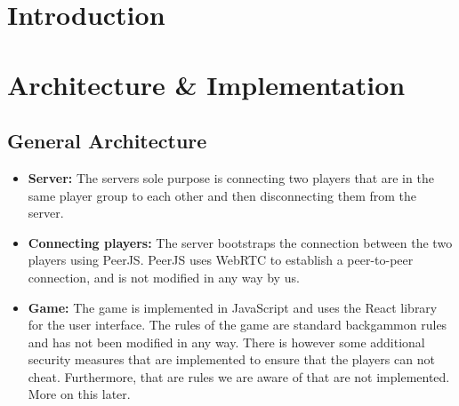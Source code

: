 \documentclass[ twoside,openright,titlepage,numbers=noenddot,headinclude,%
                footinclude=true,cleardoublepage=empty,abstractoff, %
                BCOR=5mm,paper=a4,fontsize=11pt,%
                ngerman,american,%
                ]{scrreprt}
\begin{document}
\frenchspacing
\raggedbottom
{} %
\pagestyle{plain}



\pagestyle{scrheadings}
\cleardoublepage
\cleardoublepage{}
\cleardoublepage


\chapter{Introduction}
\label{cha:introduction}


\chapter{Architecture \& Implementation}
\label{cha:arch--impl}

\section{General Architecture}

\begin{itemize}
  \item \textbf{Server:} The servers sole purpose is connecting two players that are in the same player group to each other and then disconnecting them from the server. 
  \item \textbf{Connecting players:} The server bootstraps the connection between the two players using PeerJS. PeerJS uses WebRTC to establish a peer-to-peer connection, and is not modified in any way by us.
  \item \textbf{Game:} The game is implemented in JavaScript and uses the React library for the user interface. The rules of the game are standard backgammon rules and has not been modified in any way. There is however some additional security measures that are implemented to ensure that the players can not cheat. Furthermore, that are rules we are aware of that are not implemented. More on this later.
\end{itemize}
\end{document}
